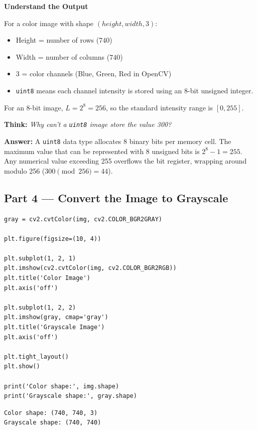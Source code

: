 \documentclass[12pt]{article}
\begin{document}
\textbf{Understand the Output}

For a color image with shape $(height, width, 3)$:
\begin{itemize}
    \setlength\itemsep{0pt}
    \item Height = number of rows ($740$)
    \item Width = number of columns ($740$)
    \item 3 = color channels (Blue, Green, Red in OpenCV)
    \item \texttt{uint8} means each channel intensity is stored using an 8-bit unsigned integer.
\end{itemize}

For an 8-bit image, $L = 2^8 = 256$, so the standard intensity range is $[0, 255]$.

\textbf{Think:} \textit{Why can't a \texttt{uint8} image store the value 300?}

\textbf{Answer:} A \texttt{uint8} data type allocates 8 binary bits per memory cell. The maximum value that can be represented with 8 unsigned bits is $2^8 - 1 = 255$. Any numerical value exceeding 255 overflows the bit register, wrapping around modulo 256 ($300 \pmod{256} = 44$).

\subsection*{Part 4 — Convert the Image to Grayscale}

\begin{lstlisting}[style=code]
gray = cv2.cvtColor(img, cv2.COLOR_BGR2GRAY)

plt.figure(figsize=(10, 4))

plt.subplot(1, 2, 1)
plt.imshow(cv2.cvtColor(img, cv2.COLOR_BGR2RGB))
plt.title('Color Image')
plt.axis('off')

plt.subplot(1, 2, 2)
plt.imshow(gray, cmap='gray')
plt.title('Grayscale Image')
plt.axis('off')

plt.tight_layout()
plt.show()

print('Color shape:', img.shape)
print('Grayscale shape:', gray.shape)
\end{lstlisting}

\begin{lstlisting}[style=output]
Color shape: (740, 740, 3)
Grayscale shape: (740, 740)
\end{lstlisting}
\end{document}

